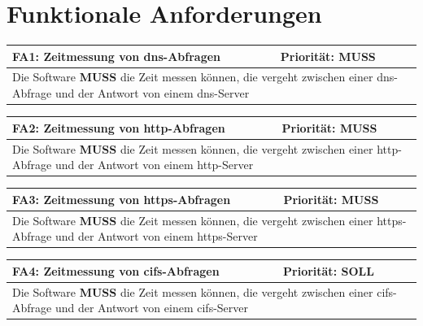 \documentclass[titlepage]{report}
\begin{document}
\section*{Funktionale Anforderungen}
\begin{center}
\begin{tabular}{p{}>{\raggedleft\arraybackslash}p{}}\toprule
    \textbf{FA1: Zeitmessung von \gls{dns}-Abfragen } & \textbf{Priorität: MUSS} \\\midrule
	\multicolumn{2}{p{\textwidth-\tabcolsep}}{%
    Die Software \textbf{MUSS} die Zeit messen können, die vergeht
    zwischen einer \gls{dns}-Abfrage und der Antwort von einem
    \gls{dns}-Server}\\\bottomrule
\end{tabular}
\end{center}
\begin{center}
\begin{tabular}{p{}>{\raggedleft\arraybackslash}p{}}\toprule
    \textbf{FA2: Zeitmessung von \gls{http}-Abfragen } & \textbf{Priorität: MUSS} \\\midrule
	\multicolumn{2}{p{\textwidth-\tabcolsep}}{%
    Die Software \textbf{MUSS} die Zeit messen können, die vergeht
    zwischen einer \gls{http}-Abfrage und der Antwort von einem
    \gls{http}-Server}\\\bottomrule
\end{tabular}
\end{center}
\begin{center}
\begin{tabular}{p{}>{\raggedleft\arraybackslash}p{}}\toprule
    \textbf{FA3: Zeitmessung von \gls{https}-Abfragen } & \textbf{Priorität: MUSS} \\\midrule
	\multicolumn{2}{p{\textwidth-\tabcolsep}}{%
    Die Software \textbf{MUSS} die Zeit messen können, die vergeht
    zwischen einer \gls{https}-Abfrage und der Antwort von einem
    \gls{https}-Server}\\\bottomrule
\end{tabular}
\end{center}
\begin{center}
\begin{tabular}{p{}>{\raggedleft\arraybackslash}p{}}\toprule
    \textbf{FA4: Zeitmessung von \gls{cifs}-Abfragen } & \textbf{Priorität: SOLL} \\\midrule
	\multicolumn{2}{p{\textwidth-\tabcolsep}}{%
    Die Software \textbf{MUSS} die Zeit messen können, die vergeht
    zwischen einer \gls{cifs}-Abfrage und der Antwort von einem
    \gls{cifs}-Server}\\\bottomrule
\end{tabular}
\end{center}
\end{document}
